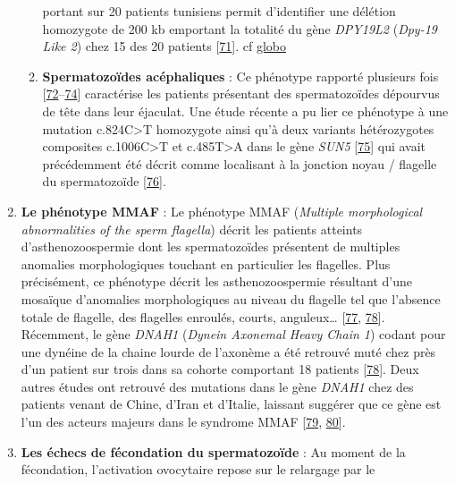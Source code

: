 \documentclass[12pt,twoside]{reedthesis}
\theoremstyle{definition}
\theoremstyle{definition}
\theoremstyle{remark}
\begin{document}
\begin{enumerate}
\begin{enumerate}
      portant sur 20 patients tunisiens permit d'identifier une délétion
      homozygote de 200 kb emportant la totalité du gène \emph{DPY19L2}
      (\emph{Dpy-19 Like 2}) chez 15 des 20 patients
      {[}\protect\hyperlink{ref-Harbuz2011}{71}{]}. cf
      \protect\hyperlink{globo}{globo}\\
    \item
      \textbf{Spermatozoïdes acéphaliques} : Ce phénotype rapporté
      plusieurs fois
      {[}\protect\hyperlink{ref-Chemes2010}{72}--\protect\hyperlink{ref-Chemes1987}{74}{]}
      caractérise les patients présentant des spermatozoïdes dépourvus de
      tête dans leur éjaculat. Une étude récente a pu lier ce phénotype à
      une mutation c.824C\textgreater{}T homozygote ainsi qu'à deux
      variants hétérozygotes composites c.1006C\textgreater{}T et
      c.485T\textgreater{}A dans le gène \emph{SUN5}
      {[}\protect\hyperlink{ref-Zhu2016}{75}{]} qui avait précédemment été
      décrit comme localisant à la jonction noyau / flagelle du
      spermatozoïde {[}\protect\hyperlink{ref-Yassine2015}{76}{]}.
    \end{enumerate}
  \item
    \textbf{Le phénotype MMAF} : Le phénotype MMAF (\emph{Multiple
    morphological abnormalities of the sperm flagella}) décrit les
    patients atteints d'asthenozoospermie dont les spermatozoïdes
    présentent de multiples anomalies morphologiques touchant en
    particulier les flagelles. Plus précisément, ce phénotype décrit les
    asthenozoospermie résultant d'une mosaïque d'anomalies morphologiques
    au niveau du flagelle tel que l'absence totale de flagelle, des
    flagelles enroulés, courts, anguleux\ldots{}
    {[}\protect\hyperlink{ref-Coutton2015}{77},
    \protect\hyperlink{ref-BenKhelifa2014}{78}{]}. Récemment, le gène
    \emph{DNAH1} (\emph{Dynein Axonemal Heavy Chain 1}) codant pour une
    dynéine de la chaine lourde de l'axonème a été retrouvé muté chez près
    d'un patient sur trois dans sa cohorte comportant 18 patients
    {[}\protect\hyperlink{ref-BenKhelifa2014}{78}{]}. Deux autres études
    ont retrouvé des mutations dans le gène \emph{DNAH1} chez des patients
    venant de Chine, d'Iran et d'Italie, laissant suggérer que ce gène est
    l'un des acteurs majeurs dans le syndrome MMAF
    {[}\protect\hyperlink{ref-Wang2017}{79},
    \protect\hyperlink{ref-Amiri-Yekta2016}{80}{]}.
  \item
    \textbf{Les échecs de fécondation du spermatozoïde} : Au moment de la
    fécondation, l'activation ovocytaire repose sur le relargage par le

\end{enumerate}
\end{document}
